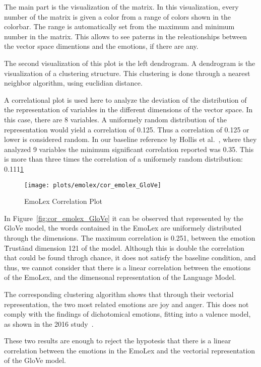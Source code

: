 The main part is the visualization of the matrix. In this visualization, every number of the matrix is given a color from a range of colors shown in the colorbar. The range is automatically set from the maximum and minimum number in the matrix. This allows to see paterns in the releationships between the vector space dimentions and the emotions, if there are any.

The second visualization of this plot is the left dendrogram. A dendrogram is the visualization of a clustering structure. This clustering is done through a nearest neighbor algorithm, using euclidian distance.

A correlational plot is used here to analyze the deviation of the distribution of the representation of variables in the different dimensions of the vector space. In this case, there are 8 variables. A uniformely random distribution of the representation would yield a correlation of 0.125. Thus a correlation of  0.125 or lower is considered random. In our baseline reference by Hollis et al.~\cite{hollis2016principals}, where they analyzed 9 variables the minimum significant correlation reported was 0.35. This is more than three times the correlation of a uniformely random distribution: 0.111\underline{1}

\begin{figure}[H]
  \texttt{[image: plots/emolex/cor\_emolex\_GloVe]}
  \centering
  \caption{EmoLex Correlation Plot}
\end{figure}\label{fig:cor_emolex_GloVe}

In Figure~\ref{fig:cor_emolex_GloVe} it can be observed that represented by the GloVe model, the words contained in the EmoLex are uniformely distributed through the dimensions. The maximum correlation is 0.251, between the emotion \"Trust\" and dimension 121 of the model. Although this is double the correlation that could be found throgh chance, it does not satisfy the baseline condition, and thus, we cannot consider that there is a linear correlation between the emotions of the EmoLex, and the dimensonal representation of the Language Model.

The corresponding clustering algorithm shows that through their vectorial representation, the two most related emotions are joy and anger. This does not comply with the findings of dichotomical emotions, fitting into a valence model, as shown in the 2016 study~\cite{barradas2016thesis}.

These two results are enough to reject the hypotesis that there is a linear correlation between the emotions in the EmoLex and the vectorial representation of the GloVe model.


